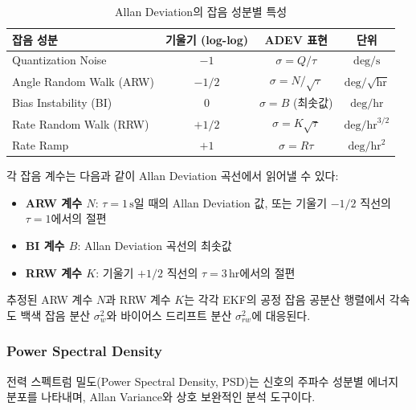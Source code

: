                 \begin{table}[H]
                    \centering
                    \caption{Allan Deviation의 잡음 성분별 특성}
                    \label{tab:avar_slopes}
                    \begin{tabular}{lccc}
                        \toprule
                        잡음 성분 & 기울기 (log-log) & ADEV 표현 & 단위 \\
                        \midrule
                        Quantization Noise & $-1$ & $\sigma = Q/\tau$ & $\text{deg}/\text{s}$ \\
                        Angle Random Walk (ARW) & $-1/2$ & $\sigma = N/\sqrt{\tau}$ & $\text{deg}/\sqrt{\text{hr}}$ \\
                        Bias Instability (BI) & $0$ & $\sigma = B$ (최솟값) & $\text{deg}/\text{hr}$ \\
                        Rate Random Walk (RRW) & $+1/2$ & $\sigma = K\sqrt{\tau}$ & $\text{deg}/\text{hr}^{3/2}$ \\
                        Rate Ramp & $+1$ & $\sigma = R\tau$ & $\text{deg}/\text{hr}^2$ \\
                        \bottomrule
                    \end{tabular}
                \end{table}

                각 잡음 계수는 다음과 같이 Allan Deviation 곡선에서 읽어낼 수 있다:\\

                \begin{itemize}
                    \item \textbf{ARW 계수 $N$}: $\tau = 1\,\text{s}$일 때의 Allan Deviation 값, 또는 기울기 $-1/2$ 직선의 $\tau = 1$에서의 절편
                    \item \textbf{BI 계수 $B$}: Allan Deviation 곡선의 최솟값
                    \item \textbf{RRW 계수 $K$}: 기울기 $+1/2$ 직선의 $\tau = 3\,\text{hr}$에서의 절편
                \end{itemize}

                추정된 ARW 계수 $N$과 RRW 계수 $K$는 각각 EKF의 공정 잡음 공분산 행렬에서 각속도 백색 잡음 분산 $\sigma_w^2$와 바이어스 드리프트 분산 $\sigma_{rw}^2$에 대응된다.\\

        \subsubsection{Power Spectral Density}
            전력 스펙트럼 밀도(Power Spectral Density, PSD)는 신호의 주파수 성분별 에너지 분포를 나타내며, Allan Variance와 상호 보완적인 분석 도구이다.\\

